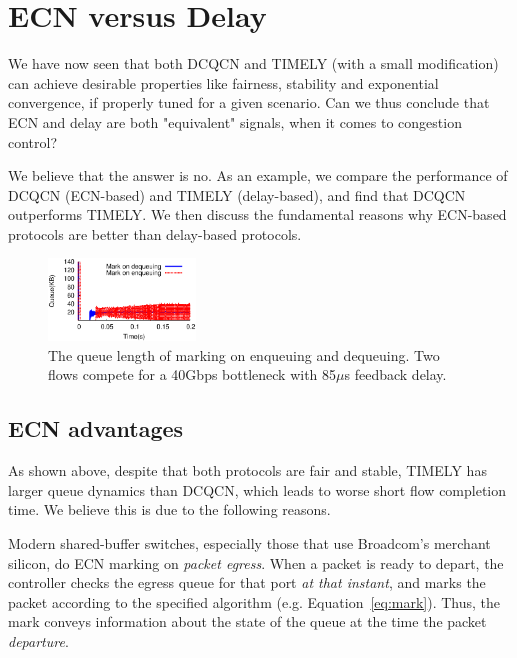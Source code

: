 \vspace{-0.5em}
\section {ECN versus Delay}
\label{sec:discuss}

We have now seen that both DCQCN and TIMELY (with a small modification) can achieve
desirable properties like fairness, stability and exponential convergence, if 
properly tuned for a given scenario. Can we thus conclude
that ECN and delay are both "equivalent" signals, when it comes to congestion
control? 

We believe that the answer is no. As an example, we compare the performance of 
DCQCN (ECN-based) and TIMELY (delay-based), and find that DCQCN outperforms TIMELY. 
We then discuss the fundamental reasons why ECN-based protocols are better than delay-based 
protocols. 





\begin{figure}[t]
\center
\includegraphics[width=0.35\textwidth]{figures/dcqcn_bufferbloat.eps}
\caption{The queue length of marking on enqueuing and dequeuing. 
Two flows compete for a 40Gbps bottleneck with 85$\mu$s feedback delay.}
\vspace{-1.5em}
\label{fig:dcqcn_bufferbloat}
\end{figure}
\fi

\vspace{-0.5em}
\subsection{ECN advantages}
\label{sec:ecn_advantages}

As shown above, despite that both protocols are fair and stable, TIMELY has larger
queue dynamics than DCQCN, which leads to worse short flow completion time. 
We believe this is due to the following reasons.

Modern shared-buffer switches, especially those that use Broadcom's merchant
silicon, do ECN marking on {\em packet egress}. When a packet is ready to
depart, the controller checks the egress queue for that port {\em at that
instant}, and marks the packet according to the specified algorithm
(e.g.  Equation~\ref{eq:mark}). Thus, the mark conveys information about the
state of the queue at the time the packet {\em departure}.

